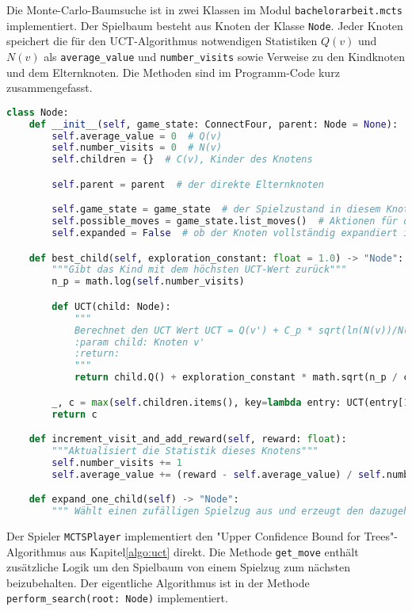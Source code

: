 Die Monte-Carlo-Baumsuche ist in zwei Klassen im Modul \verb|bachelorarbeit.mcts| implementiert.
Der Spielbaum besteht aus Knoten der Klasse \verb|Node|.
Jeder Knoten speichert die für den UCT-Algorithmus notwendigen Statistiken $Q(v)$ und $N(v)$ als \verb|average_value| und \verb|number_visits| sowie Verweise zu den Kindknoten und dem Elternknoten.
Die Methoden sind im Programm-Code kurz zusammengefasst.

\begin{lstlisting}[language=Python,caption=Der Knoten der Monte-Carlo-Baumsuche,label={lst:mcts-node}]
class Node:
    def __init__(self, game_state: ConnectFour, parent: Node = None):
        self.average_value = 0  # Q(v)
        self.number_visits = 0  # N(v)
        self.children = {}  # C(v), Kinder des Knotens

        self.parent = parent  # der direkte Elternknoten

        self.game_state = game_state  # der Spielzustand in diesem Knoten
        self.possible_moves = game_state.list_moves()  # Aktionen für die noch nicht erforschten Kindknoten
        self.expanded = False  # ob der Knoten vollständig expandiert ist

    def best_child(self, exploration_constant: float = 1.0) -> "Node":
        """Gibt das Kind mit dem höchsten UCT-Wert zurück"""
        n_p = math.log(self.number_visits)

        def UCT(child: Node):
            """
            Berechnet den UCT Wert UCT = Q(v') + C_p * sqrt(ln(N(v))/N(v'))
            :param child: Knoten v'
            :return:
            """
            return child.Q() + exploration_constant * math.sqrt(n_p / child.number_visits)

        _, c = max(self.children.items(), key=lambda entry: UCT(entry[1]))
        return c

    def increment_visit_and_add_reward(self, reward: float):
        """Aktualisiert die Statistik dieses Knotens"""
        self.number_visits += 1
        self.average_value += (reward - self.average_value) / self.number_visits

    def expand_one_child(self) -> "Node":
        """ Wählt einen zufälligen Spielzug aus und erzeugt den dazugehörigen Kindknoten"""

\end{lstlisting}

Der Spieler \verb|MCTSPlayer| implementiert den "Upper Confidence Bound for Trees"-Algorithmus aus Kapitel\~\ref{algo:uct} direkt.
Die Methode \verb|get_move| enthält zusätzliche Logik um den Spielbaum von einem Spielzug zum nächsten beizubehalten.
Der eigentliche Algorithmus ist in der Methode \verb|perform_search(root: Node)| implementiert.


